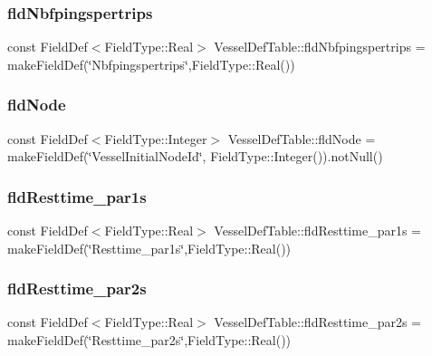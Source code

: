 \mbox{\label{class_vessel_def_table_aa90a3f02e8dce0a41b7cde977d1619e5}} 
\subsubsection{\texorpdfstring{fldNbfpingspertrips}{fldNbfpingspertrips}}
{\footnotesize\ttfamily const Field\+Def$<$Field\+Type\+::\+Real$>$ Vessel\+Def\+Table\+::fld\+Nbfpingspertrips = make\+Field\+Def(\char`\"{}Nbfpingspertrips\char`\"{},Field\+Type\+::\+Real())}

\mbox{\label{class_vessel_def_table_ad7f7871d2d5b43453915b68ae905a2d4}} 
\subsubsection{\texorpdfstring{fldNode}{fldNode}}
{\footnotesize\ttfamily const Field\+Def$<$Field\+Type\+::\+Integer$>$ Vessel\+Def\+Table\+::fld\+Node = make\+Field\+Def(\char`\"{}Vessel\+Initial\+Node\+Id\char`\"{}, Field\+Type\+::\+Integer()).not\+Null()}

\mbox{\label{class_vessel_def_table_ae22adb79e5172a486bd77b25fe9b7533}} 
\subsubsection{\texorpdfstring{fldResttime\_par1s}{fldResttime\_par1s}}
{\footnotesize\ttfamily const Field\+Def$<$Field\+Type\+::\+Real$>$ Vessel\+Def\+Table\+::fld\+Resttime\+\_\+par1s = make\+Field\+Def(\char`\"{}Resttime\+\_\+par1s\char`\"{},Field\+Type\+::\+Real())}

\mbox{\label{class_vessel_def_table_a5a653e96fac17d4c5efe2711daef73c3}} 
\subsubsection{\texorpdfstring{fldResttime\_par2s}{fldResttime\_par2s}}
{\footnotesize\ttfamily const Field\+Def$<$Field\+Type\+::\+Real$>$ Vessel\+Def\+Table\+::fld\+Resttime\+\_\+par2s = make\+Field\+Def(\char`\"{}Resttime\+\_\+par2s\char`\"{},Field\+Type\+::\+Real())}

